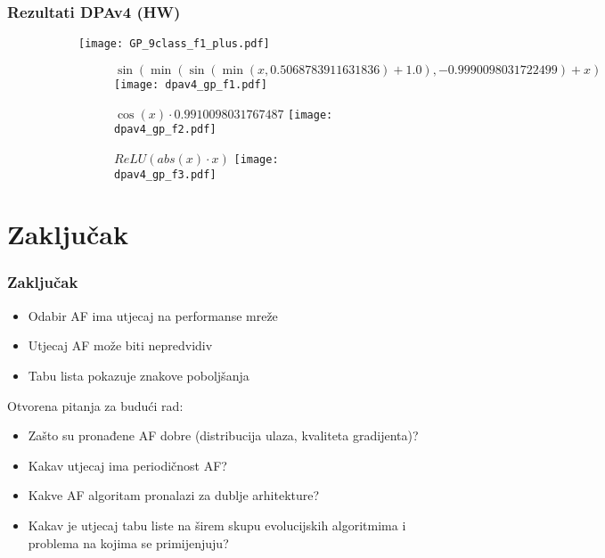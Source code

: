\documentclass{beamer}
\begin{document}
\begin{frame}
\frametitle{Rezultati DPAv4 (HW)}

\begin{figure}
\centering
\begin{subfigure}{.49\textwidth}
  \centering
  \texttt{[image: GP\_9class\_f1\_plus.pdf]}
\end{subfigure}
\begin{subfigure}{.49\textwidth}
  \centering
  \begin{subfigure}{\linewidth}
    \centering
    \tiny $\sin (\min (\sin (\min (x,0.5068783911631836) + 1.0),-0.9990098031722499) + x)$
    \texttt{[image: dpav4\_gp\_f1.pdf]}
  \end{subfigure}
  \begin{subfigure}{\linewidth}
    \centering
    \vspace{2mm}
	\tiny $\cos (x) \cdot 0.9910098031767487$    
    \texttt{[image: dpav4\_gp\_f2.pdf]}
  \end{subfigure}
  \begin{subfigure}{\linewidth}
    \centering
    \vspace{2mm}
    \tiny $ReLU (abs (x) \cdot x)$
    \texttt{[image: dpav4\_gp\_f3.pdf]}
  \end{subfigure}
\end{subfigure}
\end{figure}

\end{frame}

\section{Zaključak}

\begin{frame}
\frametitle{Zaključak}

\begin{itemize}
\item Odabir AF ima utjecaj na performanse mreže
\item Utjecaj AF može biti nepredvidiv
\item Tabu lista pokazuje znakove poboljšanja
\end{itemize}

Otvorena pitanja za budući rad:

\begin{itemize}
\item Zašto su pronađene AF dobre (distribucija ulaza, kvaliteta gradijenta)?
\item Kakav utjecaj ima periodičnost AF?
\item Kakve AF algoritam pronalazi za dublje arhitekture?
\item Kakav je utjecaj tabu liste na širem skupu evolucijskih algoritmima i problema na kojima se primijenjuju?
\end{itemize}

\end{frame}
\end{document}
